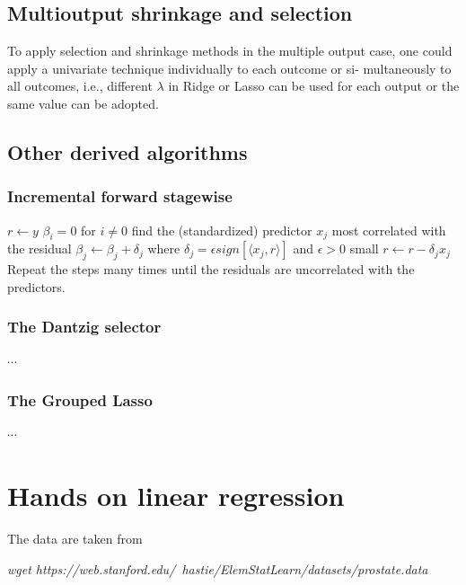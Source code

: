 \documentclass[12pt, letterpaper]{article}
\theoremstyle{definition}
\let\ti\textit
\begin{document}
\subsection{Multioutput shrinkage and selection}
To apply selection and shrinkage methods in the multiple output case, one could apply a univariate technique individually to each outcome or si- multaneously to all outcomes, i.e., different $\lambda$ in Ridge or Lasso can be used for each output or the same value can be adopted.

\subsection{Other derived algorithms}
\subsubsection{Incremental forward stagewise}
\begin{algorithm}
$r\leftarrow y$ \;
$\beta_i =0$ for $i\ne 0$\;
find the (standardized) predictor $x_j$ most correlated with the residual \;
$\beta_j \leftarrow \beta_j + \delta_j$ where $\delta_j = \epsilon sign\left[\langle x_j, r \rangle\right]$ and $\epsilon >0$ small\;
$r\leftarrow r-\delta_j x_j$\;
Repeat the steps many times until the residuals are uncorrelated with the predictors.
\end{algorithm}

\subsubsection{The Dantzig selector}
$\cdots$

\subsubsection{The Grouped Lasso}
$\cdots$

\newpage

\section{Hands on linear regression}
The data are taken from 

\ti{wget https://web.stanford.edu/~hastie/ElemStatLearn/datasets/prostate.data} 
\end{document}
